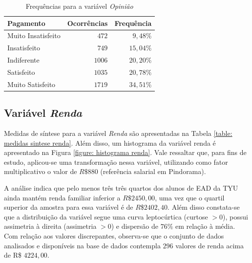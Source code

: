 \documentclass[10pt,a4paper,oneside]{article}
\begin{document}
\begin{table}[h]
\small
\centering
\caption{Frequências para a variável \textit{Opinião}}
\label{table: frequencias opiniao}
\vspace{0.5em}
\begin{tabular}{l r r}
	\toprule
	\textbf{Pagamento}     & \textbf{Ocorrências} & \textbf{Frequência} \\
	\midrule
	Muito Insatisfeito     & $472$                & $9,48\%$            \\
	Insatisfeito           & $749$                & $15,04\%$           \\
	Indiferente            & $1006$               & $20,20\%$           \\
	Satisfeito             & $1035$               & $20,78\%$           \\
	Muito Satisfeito       & $1719$               & $34,51\%$           \\
	\bottomrule
\end{tabular}
\end{table}

\subsection*{Variável \textit{Renda}}

Medidas de síntese para a variável \textit{Renda} são apresentadas na Tabela \ref{table: medidas sintese renda}. Além disso, um histograma da variável renda é apresentado na Figura \ref{figure: histograma renda}. Vale ressaltar que, para fins de estudo, aplicou-se uma transformação nessa variável, utilizando como fator multiplicativo o valor de $R\$880$ (referência salarial em Pindorama). 

A análise indica que pelo menos três três quartos dos alunos de EAD da TYU ainda mantém renda familiar inferior a $R\$2450,00$, uma vez que o quartil superior da amostra para essa variável é de $R$\$$2402,40$. Além disso constata-se que a distribuição da variável segue uma curva leptocúrtica (curtose $> 0$), possui assimetria à direita (assimetria $> 0$) e dispersão de $76\%$ em relação à média. Com relação aos valores discrepantes, observa-se que o conjunto de dados analisados e disponíveis na base de dados contempla $296$ valores de renda acima de R\$ $4224,00$.
\end{document}
